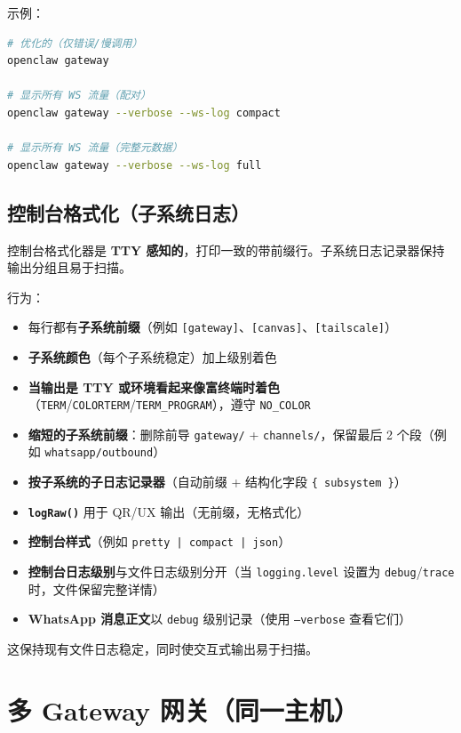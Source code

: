 示例：

\begin{lstlisting}[language=bash]
# 优化的（仅错误/慢调用）
openclaw gateway

# 显示所有 WS 流量（配对）
openclaw gateway --verbose --ws-log compact

# 显示所有 WS 流量（完整元数据）
openclaw gateway --verbose --ws-log full
\end{lstlisting}


\subsection{控制台格式化（子系统日志）}


控制台格式化器是 \textbf{TTY 感知的}，打印一致的带前缀行。子系统日志记录器保持输出分组且易于扫描。

行为：

\begin{itemize}
  \item 每行都有\textbf{子系统前缀}（例如 \texttt{[gateway]}、\texttt{[canvas]}、\texttt{[tailscale]}）
  \item \textbf{子系统颜色}（每个子系统稳定）加上级别着色
  \item \textbf{当输出是 TTY 或环境看起来像富终端时着色}（\texttt{TERM}/\texttt{COLORTERM}/\texttt{TERM\_PROGRAM}），遵守 \texttt{NO\_COLOR}
  \item \textbf{缩短的子系统前缀}：删除前导 \texttt{gateway/} + \texttt{channels/}，保留最后 2 个段（例如 \texttt{whatsapp/outbound}）
  \item \textbf{按子系统的子日志记录器}（自动前缀 + 结构化字段 \texttt{\{ subsystem \}}）
  \item \textbf{\texttt{logRaw()}} 用于 QR/UX 输出（无前缀，无格式化）
  \item \textbf{控制台样式}（例如 \texttt{pretty | compact | json}）
  \item \textbf{控制台日志级别}与文件日志级别分开（当 \texttt{logging.level} 设置为 \texttt{debug}/\texttt{trace} 时，文件保留完整详情）
  \item \textbf{WhatsApp 消息正文}以 \texttt{debug} 级别记录（使用 \texttt{--verbose} 查看它们）
\end{itemize}


这保持现有文件日志稳定，同时使交互式输出易于扫描。


\clearpage

\section{多 Gateway 网关（同一主机）}


